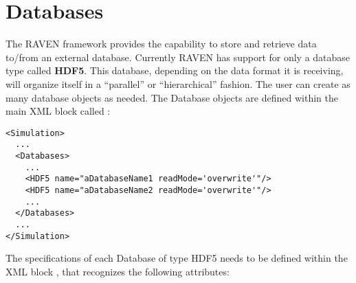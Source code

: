 \section{Databases}
\label{sec:Databases}
The RAVEN framework provides the capability to store and retrieve data to/from
an external database.
%
Currently RAVEN has support for only a database type called \textbf{HDF5}.
%
This database, depending on the data format it is receiving, will organize
itself in a ``parallel'' or ``hierarchical'' fashion.
%
The user can create as many database objects as needed.
%
The Database objects are defined within the main XML block called
:
\begin{lstlisting}[style=XML]
<Simulation>
  ...
  <Databases>
    ...
    <HDF5 name="aDatabaseName1 readMode='overwrite'"/>
    <HDF5 name="aDatabaseName2 readMode='overwrite'"/>
    ...
  </Databases>
  ...
</Simulation>
\end{lstlisting}
The specifications of each Database of type HDF5 needs to be defined within the
XML block , that recognizes the following attributes:
\vspace{-5mm}
